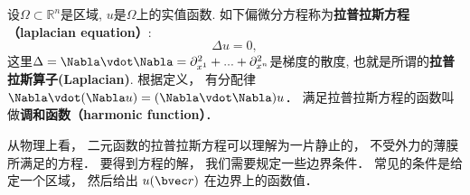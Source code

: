 

设$\Omega\subset\mathbb{R}^n$是区域, $u$是$\Omega$上的实值函数. 如下偏微分方程称为\textbf{拉普拉斯方程（laplacian equation）}:
\begin{equation}\label{LapEq_eq6}
\Delta u = 0,
\end{equation}
这里$\Delta=\Nabla\vdot\Nabla=\partial_{x^1}^2+...+\partial_{x^n}^2$是梯度的散度, 也就是所谓的\textbf{拉普拉斯算子(Laplacian)}. 根据定义， 有分配律 $\Nabla \vdot (\Nabla u) = (\Nabla \vdot \Nabla) u$． 满足拉普拉斯方程的函数叫做\textbf{调和函数（harmonic function）}．

从物理上看， 二元函数的拉普拉斯方程可以理解为一片静止的， 不受外力的薄膜所满足的方程． 要得到方程的解， 我们需要规定一些边界条件． 常见的条件是给定一个区域， 然后给出 $u(\bvec r)$ 在边界上的函数值．

